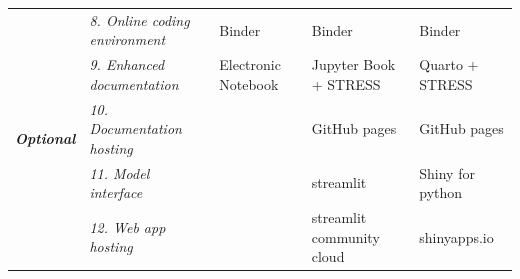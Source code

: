 \documentclass[]{interact}
\theoremstyle{plain}%
\theoremstyle{definition}
\theoremstyle{remark}
\begin{document}
\begin{table}[htp!]
{\begin{tabular}{lllll}
\multirow{5}{*}{\textit{\textbf{Optional}}} & \textit{8. Online coding environment} & Binder                                                       & Binder                                                       & Binder                                                       \\
                                            & \textit{9. Enhanced documentation}    & Electronic Notebook                                          & Jupyter Book + STRESS                                                & Quarto + STRESS                                                      \\
                                            & \textit{10. Documentation hosting}    &                                                              & GitHub pages                                                 & GitHub pages                                                 \\
                                            & \textit{11. Model interface}          &                                                              & streamlit                                                    & Shiny for python                                             \\
                                            & \textit{12. Web app hosting}          &                                                              & streamlit community cloud                                    & shinyapps.io \\   
                                            \bottomrule
\end{tabular}}
\label{tab:applied_examples}
\end{table}
\end{document}
